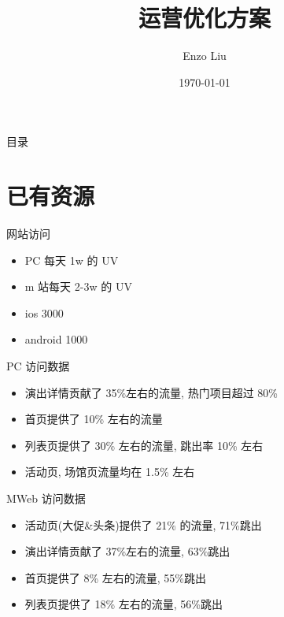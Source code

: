 \documentclass[presentation,bigger]{beamer}
\author{Enzo Liu}
\date{\today}
\title{运营优化方案}
\begin{document}
\maketitle
\begin{frame}{目录}
\tableofcontents
\end{frame}


\section{已有资源}
\label{sec:orgheadline6}
\begin{frame}[label={sec:orgheadline1}]{网站访问}
\begin{itemize}
\item PC 每天 1w 的 UV
\item m 站每天 2-3w 的 UV
\item ios 3000
\item android 1000
\end{itemize}
\end{frame}

\begin{frame}[label={sec:orgheadline2}]{PC 访问数据}
\begin{itemize}
\item 演出详情贡献了 35\%左右的流量, 热门项目超过 80\%
\item 首页提供了 10\% 左右的流量
\item 列表页提供了 30\% 左右的流量,  跳出率 10\% 左右
\item 活动页, 场馆页流量均在 1.5\% 左右
\end{itemize}
\end{frame}

\begin{frame}[label={sec:orgheadline3}]{MWeb 访问数据}
\begin{itemize}
\item 活动页(大促\&头条)提供了 21\% 的流量, 71\%跳出
\item 演出详情贡献了 37\%左右的流量, 63\%跳出
\item 首页提供了 8\% 左右的流量, 55\%跳出
\item 列表页提供了 18\% 左右的流量, 56\%跳出
\end{itemize}
\end{frame}
\end{document}
